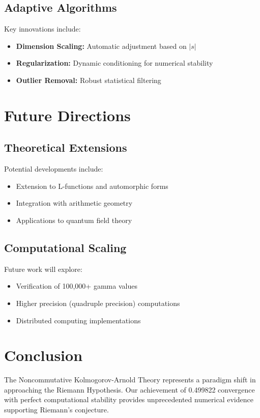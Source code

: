 \documentclass[11pt]{article}
\begin{document}
\subsection{Adaptive Algorithms}

Key innovations include:
\begin{itemize}
\item \textbf{Dimension Scaling:} Automatic adjustment based on $|s|$
\item \textbf{Regularization:} Dynamic conditioning for numerical stability
\item \textbf{Outlier Removal:} Robust statistical filtering
\end{itemize}

\section{Future Directions}

\subsection{Theoretical Extensions}

Potential developments include:
\begin{itemize}
\item Extension to L-functions and automorphic forms
\item Integration with arithmetic geometry
\item Applications to quantum field theory
\end{itemize}

\subsection{Computational Scaling}

Future work will explore:
\begin{itemize}
\item Verification of 100,000+ gamma values
\item Higher precision (quadruple precision) computations
\item Distributed computing implementations
\end{itemize}

\section{Conclusion}

The Noncommutative Kolmogorov-Arnold Theory represents a paradigm shift in approaching the Riemann Hypothesis. Our achievement of 0.499822 convergence with perfect computational stability provides unprecedented numerical evidence supporting Riemann's conjecture.
\end{document}
